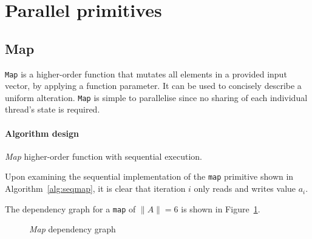 \section{Parallel primitives}
\subsection{Map}
\verb|Map| is a higher-order function that mutates all elements in a provided input vector, by applying a function parameter. It can be used to concisely describe a uniform alteration.
\verb|Map| is simple to parallelise since no sharing of each individual thread's state is required.
\paragraph*{Algorithm design}
\begin{algorithm}
  \caption{\emph{Map} higher-order function with sequential execution.}
  \label{alg:seqmap}

  \begin{algorithmic}
      \EndFor
    \EndFunction
  \end{algorithmic}
\end{algorithm}

Upon examining the sequential implementation of the \verb|map| primitive shown in Algorithm~\ref{alg:seqmap}, it is clear that iteration $i$ only reads and writes value $a_i$.

The dependency graph for a \verb|map| of $\|A\| = 6$ is shown in Figure~\ref{fig:mapgraph}.

\begin{figure}[h]
  \caption{\emph{Map} dependency graph}
  \label{fig:mapgraph}
  \begin{center}
  \end{center}
\end{figure}

